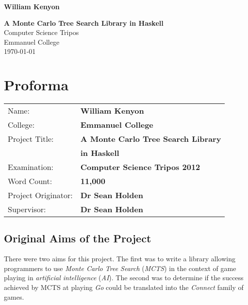 \documentclass[12pt,twoside,notitlepage]{report}
\theoremstyle{definition}
\begin{document}


\pagestyle{empty}

\hfill{\LARGE \bf William Kenyon}

\vspace*{60mm}
\begin{center}
\Huge
{\bf A Monte Carlo Tree Search Library in Haskell} \\
\vspace*{5mm}
Computer Science Tripos \\
\vspace*{5mm}
Emmanuel College \\
\vspace*{5mm}
\today  %
\end{center}

\cleardoublepage


\setcounter{page}{1}
\pagestyle{plain}

\chapter*{Proforma}

{\large
\begin{tabular}{ll}
Name:               & \bf William Kenyon                       \\
College:            & \bf Emmanuel College                     \\
Project Title:      & \bf A Monte Carlo Tree Search Library\\
                    & \bf in Haskell \\
Examination:        & \bf Computer Science Tripos 2012        \\
Word Count:         & \bf 11,000\\
Project Originator: & \bf Dr Sean Holden                    \\
Supervisor:         & \bf Dr Sean Holden                    \\ 
\end{tabular}
}


\section*{Original Aims of the Project}
There were two aims for this project. The first was to write a library allowing programmers to use \textit{Monte Carlo Tree Search} (\textit{MCTS}) in the context of game playing in \textit{artificial intelligence} (\textit{AI}). The second was to determine if the success achieved by MCTS at playing \textit{Go} could be translated into the \textit{Connect} family of games.
\end{document}
